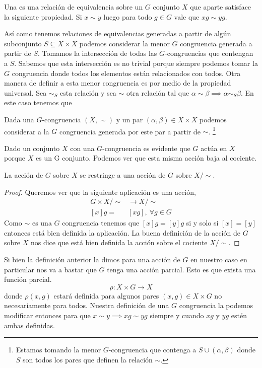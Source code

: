 \documentclass[tesis.tex]{subfiles}
\begin{document}
\begin{deff}
    Una  es una relación de equivalencia sobre un $G$ conjunto $X$ que aparte satisface la siguiente propiedad.
    Si $x \sim y$ luego para todo $g \in G$ vale que $xg \sim yg$.
\end{deff}

Así como tenemos relaciones de equivalencias generadas a partir de algún subconjunto $S \subseteq X \times X$ podemos considerar la menor $G$ congruencia generada a partir de $S$.
Tomamos la intersección de todas las $G$-congruencias que contengan a $S$. 
Sabemos que esta intersección es no trivial porque siempre podemos tomar la $G$ congruencia donde todos los elementos están relacionados con todos.
Otra manera de definir a esta menor congruencia es por medio de la propiedad universal.
Sea $\sim_S$ esta relación y sea $\sim$ otra relación tal que $\alpha \sim \beta \implies \alpha \sim_S \beta$. 
En este caso tenemos que


\begin{deff}
	Dada una $G$-congruencia $(X, \sim)$ y un par $(\alpha, \beta) \in X \times X$ podemos considerar a la $G$ congruencia generada por este par a partir de $\sim$.
	\footnote{Estamos tomando la menor $G$-congruencia que contenga a $S \cup (\alpha, \beta)$ donde $S$ son todos los pares que definen la relación $\sim$.}
\end{deff}

Dado un conjunto $X$ con una $G$-congruencia es evidente que $G$ actúa en $X$ porque $X$ es un G conjunto. 
Podemos ver que esta misma acción baja al cociente.
\begin{lema}\label{lema-accion-GCong-cociente}
	La acción de $G$ sobre $X$ se restringe a una acción de $G$ sobre $X / \sim.$
\end{lema}
\begin{proof}
	Queremos ver que la siguiente aplicación es una acción,
	\begin{align*}
	G \times X/\sim &\to X/ \sim \\
	[x]g =& [xg], \ \forall g \in G
	\end{align*}
	 Como $\sim$ es una $G$ congruencia tenemos que $[x]g = [y]g$ si y solo si $[x] = [y]$ entonces está bien definida la aplicación.
	 La buena definición de la acción de $G$ sobre $X$ nos dice que está bien definida la acción sobre el cociente $X/\sim$.
\end{proof}

Si bien la definición anterior la dimos para una acción de $G$ en nuestro caso en particular nos va a bastar que $G$ tenga una acción parcial. 
Esto es que exista una función parcial.
\begin{equation*}
\rho: X \times G \to X
\end{equation*}
donde $\rho(x,g)$ estará definida para algunos pares $(x,g) \in X \times G$ no necesariamente para todos.
Nuestra definición de una $G$ congruencia la podemos modificar entonces para que  $x \sim y \implies xg \sim yg$ siempre y cuando $xg$ y $yg$ estén ambas definidas.
\end{document}
